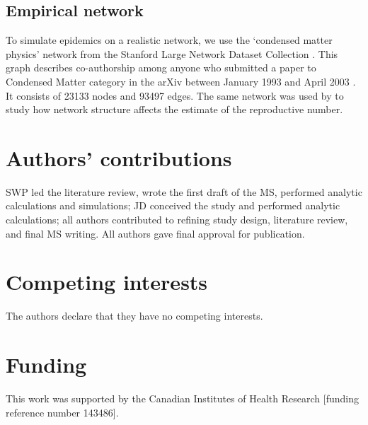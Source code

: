 \documentclass[12pt]{article}
\begin{document}
\subsection{Empirical network}

To simulate epidemics on a realistic network, we use the `condensed matter physics' network from the Stanford Large Network Dataset Collection \citep{leskovec2016snap}.
This graph describes co-authorship among anyone who submitted a paper to Condensed Matter category in the arXiv between January 1993 and April 2003 \citep{leskovec2007graph}.
It consists of 23133 nodes and 93497 edges.
The same network was used by \cite{trapman2016inferring} to study how network structure affects the estimate of the reproductive number.

\section*{Authors' contributions}

SWP led the literature review, wrote the first draft of the MS, performed analytic calculations and simulations; JD conceived the study and performed analytic calculations; all authors contributed to refining study design, literature review, and final MS writing. All authors gave final approval for publication. 

\section*{Competing interests}

The authors declare that they have no competing interests.

\section*{Funding}

This work was supported by the Canadian Institutes of Health Research [funding reference number 143486].

\pagebreak


\end{document}
